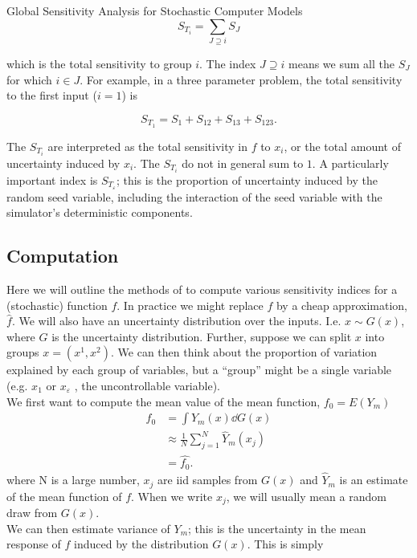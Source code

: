 \begin{chapter}{Global Sensitivity Analysis for Stochastic Computer Models}
\begin{equation}
	S_{T_i} = \sum_{J \supseteq i} S_J
\end{equation}

which is the total sensitivity to group $i$. The index ${J \supseteq i}$ means we sum all the $S_J$ for which $i \in J$. For example, in a three parameter problem, the total sensitivity to the first input ($i = 1$) is

\begin{equation}
	S_{T_1} = S_1 + S_{12} + S_{13} + S_{123}.
\end{equation}

The $S_{T_i}$ are interpreted as the total sensitivity in $f$ to $x_i$, or the total amount of uncertainty induced by $x_i$. The $S_{T_i}$ do not in general sum to $1$. A particularly important index is $S_{T_\varepsilon}$; this is the proportion of uncertainty induced by the random seed variable, including the interaction of the seed variable with the simulator's deterministic components.
\subsection{Computation}

Here we will outline the methods of \citet{Sobol1993} to compute various sensitivity indices for a (stochastic) function $f$. In practice we might replace $f$ by a cheap approximation, $\hat{f}$. We will also have an uncertainty distribution over the inputs. I.e. $x \sim G(x)$, where $G$ is the uncertainty distribution. Further, suppose we can split $x$ into groups $x = (x^1, x^2)$. We can then think about the proportion of variation explained by each group of variables, but a ``group'' might be a single variable (e.g. $x_1$ or $x_\varepsilon$ , the uncontrollable variable).\\

We first want to compute the mean value of the mean function, $f_0 = E(Y_m)$
\begin{align*}
f_0 & = \int Y_m(x) \dd G(x) \\
& \approx \frac{1}{N} \sum_{j = 1}^N \hat{Y}_m (x_j)\\
& = \hat{f_0}.
\end{align*}
where N is a large number, $x_j$ are iid samples from $G(x)$ and $\hat{Y}_m$ is an estimate of the mean function of $f$. When we write $x_j$, we will usually mean a random draw from $G(x)$.\\

We can then estimate variance of $Y_m$; this is the uncertainty in the mean response of $f$ induced by the distribution $G(x)$. This is simply


\end{chapter}
